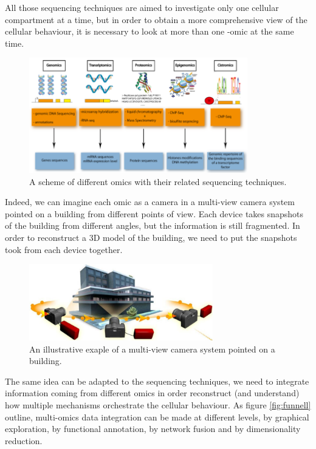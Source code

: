 All those sequencing techniques are aimed to investigate only one cellular compartment at a time, but in order to obtain a more comprehensive view of the cellular behaviour, it is necessary to look at more than one -omic at the same time.

\begin{figure}[h]
\centering
\includegraphics[width=9.5cm, keepaspectratio]{img/intro/omics.png}
\caption[Omics Representation]{A scheme of different omics with their related sequencing techniques.}
\label{fig:omics}
\end{figure}

Indeed, we can imagine each omic as a camera in a multi-view camera system pointed on a building from different points of view.
Each device takes snapshots of the building from different angles, but the information is still fragmented.
In order to reconstruct a 3D model of the building, we need to put the snapshots took from each device together.

\begin{figure}[h]
\centering
\includegraphics[width=8cm, keepaspectratio]{img/intro/cameras.png}
\caption[Integration cameras]{An illustrative exaple of a multi-view camera system pointed on a building.}
\label{fig:cameras}
\end{figure}

The same idea can be adapted to the sequencing techniques, we need to integrate information coming from different omics in order reconstruct (and understand) how multiple mechanisms orchestrate the cellular behaviour.
As figure \ref{fig:funnell} outline, multi-omics data integration can be made at different levels, by graphical exploration, by functional annotation, by network fusion and by dimensionality reduction.

